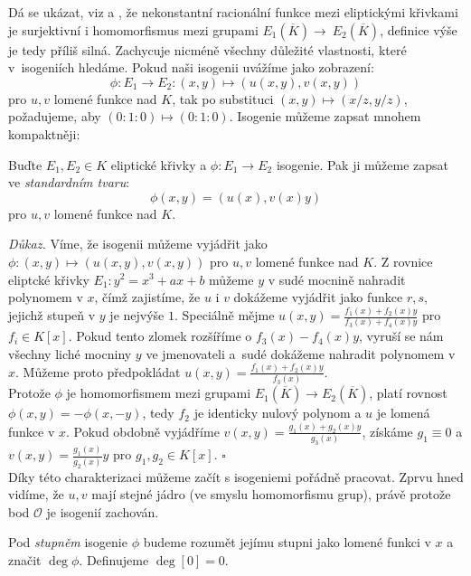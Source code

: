 \documentclass [12pt]{report}
\begin{document}
Dá se ukázat, viz \cite[II.6.8.]{Hartshorne} a \cite[III.4.8.]{Silverman}, že nekonstantní  racionální funkce mezi eliptickými křivkami je surjektivní i homomorfismus mezi grupami $E_1 (\overline{K}) \longrightarrow~E_2(\overline{K})$, definice výše je tedy příliš silná. Zachycuje nicméně všechny důležité vlastnosti, které v~isogeniích hledáme. Pokud naši isogenii uvážíme jako zobrazení:
\begin{equation*}
\phi: E_1 \longrightarrow E_2 :  (x,y) \longmapsto (u(x,y),v(x,y))
\end{equation*}
pro $u,v$ lomené funkce nad $K$, tak po substituci $(x,y) \mapsto (x/z,y/z)$, požadujeme, aby $(0:1:0) \mapsto (0:1:0)$. Isogenie můžeme zapsat mnohem kompaktněji:
\begin{veta}
Buďte $E_1,E_2 \in K$ eliptické křivky a $\phi : E_1 \longrightarrow E_2 $ isogenie. Pak ji můžeme zapsat ve \textit{standardním tvaru}:
\begin{equation*}
\phi(x,y) = \left(u(x), v(x) y \right)
\end{equation*}
pro $u,v$ lomené funkce nad $K$.  
\end{veta}

\noindent \textit{Důkaz.} Víme, že isogenii můžeme vyjádřit jako $\phi: (x,y) \mapsto (u(x,y),v(x,y))$ pro $u,v$ lomené funkce nad $K$. Z rovnice eliptcké křivky $E_1 : y^2 = x^3 + ax +b$ můžeme $y$ v sudé mocnině nahradit polynomem v $x$, čímž zajistíme, že $u$ i $v$ dokážeme vyjádřit jako funkce $r,s$, jejichž stupeň v $y$ je nejvýše $1$. Speciálně mějme $u(x,y) = \frac{f_1(x)+f_2(x)y}{f_3(x)+f_4(x) y}$ pro $f_i \in K[x]$. Pokud  tento zlomek rozšíříme o $f_3(x)-f_4(x)y$, vyruší se nám všechny liché mocniny $y$ ve jmenovateli a~sudé dokážeme nahradit polynomem v $x$. Můžeme proto předpokládat $u(x,y) = \frac{f_1(x)+f_2(x)y}{f_3(x)}$.\\

Protože $\phi$ je homomorfismem mezi grupami $E_1(\overline{K}) \longrightarrow E_2(\overline{K})$, platí rovnost $\phi(x,y) = -\phi(x,-y)$, tedy $f_2$ je identicky nulový polynom a $u$ je lomená funkce v $x$. Pokud obdobně vyjádříme $v(x,y) = \frac{g_1(x)+g_2(x)y}{g_3(x)}$, získáme $g_1 \equiv 0$ a $v(x,y) = \frac{g_1(x)}{g_2(x)}y$ pro $g_1,g_2 \in K[x]$. \hfill $\square$\\

Díky této charakterizaci můžeme začít s isogeniemi pořádně pracovat. Zprvu hned vidíme, že $u,v$  mají stejné jádro (ve smyslu homomorfismu grup), právě protože bod $\mathcal{O}$ je isogenií zachován.
\begin{definice}
Pod \textit{stupněm} isogenie $\phi$ budeme rozumět jejímu stupni jako lomené funkci v $x$ a značit $\deg \phi$. Definujeme $\deg [0] = 0$. 
\end{definice}
\end{document}
